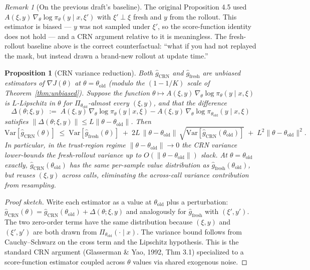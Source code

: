 \documentclass[11pt]{article}
\newtheorem{proposition}[theorem]{Proposition}
\theoremstyle{definition}
\theoremstyle{remark}
\newtheorem{remark}[theorem]{Remark}
\newcommand{\Var}{\mathrm{Var}}
\newcommand{\old}{\mathrm{old}}
\begin{document}
\begin{remark}[On the previous draft's baseline]
The original Proposition 4.5 used
$A(\xi,y)\,\nabla_\theta\log\pi_\theta(y\mid x,\xi')$ with $\xi'\perp\xi$
fresh and $y$ from the rollout.  This estimator is biased --- $y$ was not
sampled under $\xi'$, so the score-function identity does not hold ---
and a CRN argument relative to it is meaningless.  The fresh-rollout
baseline above is the correct counterfactual: ``what if you had not
replayed the mask, but instead drawn a brand-new rollout at update
time.''
\end{remark}

\begin{proposition}[CRN variance reduction]
\label{prop:crn}
Both $\hat g_{\mathrm{CRN}}$ and $\hat g_{\mathrm{fresh}}$ are unbiased
estimators of $\nabla J(\theta)$ at $\theta = \theta_\old$ (modulo the
$(1-1/K)$ scale of Theorem~\ref{thm:unbiased}).  Suppose the function
$\theta \mapsto A(\xi,y)\,\nabla_\theta\log\pi_\theta(y\mid x,\xi)$ is
$L$-Lipschitz in $\theta$ for $\Pi_{\theta_\old}$-almost every $(\xi,y)$,
and that the difference
\[
\Delta(\theta;\xi,y) \;:=\;
   A(\xi,y)\,\nabla_\theta\log\pi_\theta(y\mid x,\xi)
   - A(\xi,y)\,\nabla_\theta\log\pi_{\theta_\old}(y\mid x,\xi)
\]
satisfies $\|\Delta(\theta;\xi,y)\| \le L\|\theta - \theta_\old\|$.  Then
\begin{equation}
\Var[\hat g_{\mathrm{CRN}}(\theta)]
  \;\le\;
\Var[\hat g_{\mathrm{fresh}}(\theta)]
  \;+\;
2L\,\|\theta - \theta_\old\|\,\sqrt{\Var[\hat g_{\mathrm{CRN}}(\theta_\old)]}
  \;+\;
L^2\|\theta - \theta_\old\|^2.
\end{equation}
In particular, in the trust-region regime $\|\theta - \theta_\old\| \to 0$
the CRN variance lower-bounds the fresh-rollout variance up to
$O(\|\theta - \theta_\old\|)$ slack.  At $\theta = \theta_\old$ exactly,
$\hat g_{\mathrm{CRN}}(\theta_\old)$ has the same per-sample value
distribution as $\hat g_{\mathrm{fresh}}(\theta_\old)$, but reuses
$(\xi,y)$ across calls, eliminating the across-call variance contribution
from resampling.
\end{proposition}

\begin{proof}[Proof sketch]
Write each estimator as a value at $\theta_\old$ plus a perturbation:
$\hat g_{\mathrm{CRN}}(\theta) = \hat g_{\mathrm{CRN}}(\theta_\old) +
   \Delta(\theta;\xi,y)$ and analogously for $\hat g_{\mathrm{fresh}}$
with $(\xi',y')$.  The two zero-order terms have the same distribution
because $(\xi,y)$ and $(\xi',y')$ are both drawn from
$\Pi_{\theta_\old}(\cdot\mid x)$.  The variance bound follows from
Cauchy--Schwarz on the cross term and the Lipschitz hypothesis.  This is
the standard CRN argument (Glasserman \& Yao, 1992, Thm 3.1) specialized
to a score-function estimator coupled across $\theta$ values via shared
exogenous noise.
\end{proof}
\end{document}
